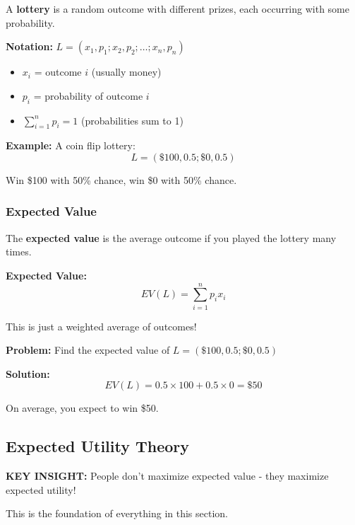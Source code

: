 \documentclass[10pt,letterpaper]{article}
\begin{document}
A \textbf{lottery} is a random outcome with different prizes, each occurring with some probability.

\textbf{Notation:} $L = (x_1, p_1; x_2, p_2; \ldots; x_n, p_n)$
\begin{itemize}
  \item $x_i$ = outcome $i$ (usually money)
  \item $p_i$ = probability of outcome $i$
  \item $\sum_{i=1}^n p_i = 1$ (probabilities sum to 1)
\end{itemize}

\begin{examplebox}
\textbf{Example:} A coin flip lottery:
\[
L = (\$100, 0.5; \$0, 0.5)
\]

Win \$100 with 50\% chance, win \$0 with 50\% chance.
\end{examplebox}

\subsubsection{Expected Value}

The \textbf{expected value} is the average outcome if you played the lottery many times.

\begin{formulabox}
\textbf{Expected Value:}
\[
\boxed{EV(L) = \sum_{i=1}^n p_i x_i}
\]

This is just a weighted average of outcomes!
\end{formulabox}

\begin{examplebox}
\textbf{Problem:} Find the expected value of $L = (\$100, 0.5; \$0, 0.5)$

\textbf{Solution:}
\[
EV(L) = 0.5 \times 100 + 0.5 \times 0 = \boxed{\$50}
\]

On average, you expect to win \$50.
\end{examplebox}

\subsection{Expected Utility Theory}

\begin{criticalbox}
\textbf{KEY INSIGHT:} People don't maximize expected value - they maximize expected utility!

This is the foundation of everything in this section.
\end{criticalbox}
\end{document}
